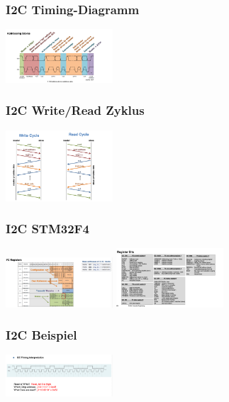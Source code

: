 \subsubsection{I2C Timing-Diagramm}
\includegraphics[width=0.3\textwidth]{sections/images/i2c_timing.png}

\subsubsection{I2C Write/Read Zyklus}
\includegraphics[width=0.3\textwidth]{sections/images/i2c_cycle.png}

\subsubsection{I2C STM32F4}
\includegraphics[width=0.3\textwidth]{sections/images/i2c_registers.png}
\includegraphics[width=0.3\textwidth]{sections/images/i2c_register_bits.png}

\subsubsection{I2C Beispiel}
\includegraphics[width=0.3\textwidth]{sections/images/i2c_example.png}